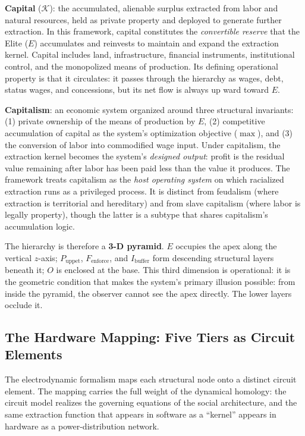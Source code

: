 \begin{definition}
\label{def:capital_capitalism}
\textbf{Capital} ($\mathcal{K}$): the accumulated, alienable surplus extracted
from labor and natural resources, held as private property and deployed to
generate further extraction. In this framework, capital constitutes the
\textit{convertible reserve} that the Elite ($E$) accumulates and reinvests
to maintain and expand the extraction kernel. Capital includes land,
infrastructure, financial instruments, institutional control, and the
monopolized means of production. Its defining operational property is that it
circulates: it passes through the hierarchy as wages, debt, status wages, and
concessions, but its net flow is always up ward toward $E$.

\textbf{Capitalism}: an economic system organized around three structural
invariants: (1) private ownership of the means of production by $E$, (2)
competitive accumulation of capital as the system's optimization objective
($\max$), and (3) the conversion of labor into commodified wage input. Under
capitalism, the extraction kernel becomes the system's
\textit{designed output}: profit is the residual value remaining after labor
has been paid less than the value it produces. The framework treats capitalism
as the \textit{host operating system}  on which racialized extraction runs as a
privileged process. It is distinct from feudalism (where extraction is
territorial and hereditary) and from slave capitalism (where labor is legally
property), though the latter is a subtype that shares capitalism's accumulation logic.
\end{definition}

The hierarchy is therefore a \textbf{3-D pyramid}. $E$ occupies the apex along the vertical $z$-axis;
$P_{\text{uppet}}$, $F_{\text{enforce}}$, and $I_{\text{buffer}}$ form descending
structural layers beneath it; $O$ is enclosed at the base. This third dimension
is operational: it is the geometric condition that makes the system's primary
illusion possible: from inside the pyramid, the observer cannot see the apex
directly. The lower layers occlude it.

\subsection{The Hardware Mapping: Five Tiers as Circuit Elements}
\label{sec:hardware_mapping}

The electrodynamic formalism maps each structural node onto a distinct circuit
element. The mapping carries the full weight of the dynamical homology: the
circuit model realizes the governing equations of the social architecture, and
the same extraction function that appears in software as a
``kernel'' appears in hardware as a power-distribution network.


